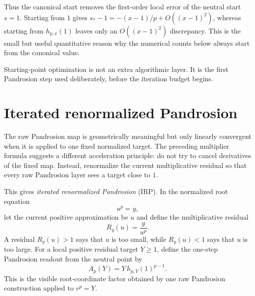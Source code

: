 \documentclass[10pt,a4paper]{article}
\theoremstyle{plain}
\theoremstyle{definition}
\theoremstyle{remark}
\newenvironment{takeaway}{%
  \begin{center}\begin{minipage}{0.92\linewidth}\small\itshape\color{blue!45!black}%
}{%
  \end{minipage}\end{center}%
}
\begin{document}
Thus the canonical start removes the first-order local error of the neutral
start $s=1$.  Starting from $1$ gives
$s_*-1=-(x-1)/p+O((x-1)^2)$, whereas starting from $h_{p,x}(1)$ leaves only an
$O((x-1)^2)$ discrepancy.  This is the small but useful quantitative reason why
the numerical counts below always start from the canonical value.

\begin{takeaway}
Starting-point optimization is not an extra algorithmic layer.  It is the first
Pandrosion step used deliberately, before the iteration budget begins.
\end{takeaway}

\section{Iterated renormalized Pandrosion}
\label{sec:irp}

The raw Pandrosion map is geometrically meaningful but only linearly
convergent when it is applied to one fixed normalized target.  The preceding
multiplier formula suggests a different acceleration principle: do not try to
cancel derivatives of the fixed map.  Instead, renormalize the current
multiplicative residual so that every raw Pandrosion layer sees a target close
to $1$.

This gives \emph{iterated renormalized Pandrosion} (IRP).  In the normalized
root equation
\[
  u^p=y,
\]
let the current positive approximation be $u$ and define the multiplicative
residual
\[
  R_y(u)=\frac{y}{u^p}.
\]
A residual $R_y(u)>1$ says that $u$ is too small, while $R_y(u)<1$ says that
$u$ is too large.  For a local positive residual target $Y\ge1$, define the
one-step Pandrosion readout from the neutral point by
\begin{equation}
  A_p(Y)=Y\,h_{p,Y}(1)^{p-1}.
  \label{eq:Ap-one-layer}
\end{equation}
This is the visible root-coordinate factor obtained by one raw Pandrosion
construction applied to $v^p=Y$.
\end{document}
